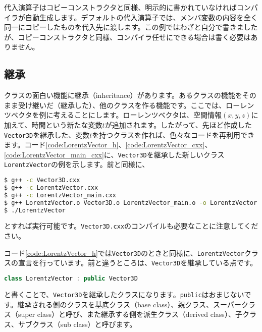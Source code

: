代入演算子はコピーコンストラクタと同様、明示的に書かれていなければコンパイラが自動生成します。デフォルトの代入演算子では、メンバ変数の内容を全く同一にコピーしたものを代入先に渡します。この例ではわざと自分で書きましたが、コピーコンストラクタと同様、コンパイラ任せにできる場合は書く必要はありません。

\subsection{継承}

クラスの面白い機能に継承（inheritance）があります。あるクラスの機能をそのまま受け継いだ（継承した）、他のクラスを作る機能です。ここでは、ローレンツベクタを例に考えることにします。ローレンツベクタは、空間情報$(x, y, z)$に加えて、時間という新たな変数$t$が追加されます。したがって、先ほど作成した\texttt{Vector3D}を継承した、変数$t$を持つクラスを作れば、色々なコードを再利用できます。コード\ref{code:LorentzVector_h}、\ref{code:LorentzVector_cxx}、\ref{code:LorentzVector_main_cxx}に、\texttt{Vector3D}を継承した新しいクラス\texttt{LorentzVector}の例を示します。前と同様に、
\begin{lstlisting}[language=bash]
$ g++ -c Vector3D.cxx
$ g++ -c LorentzVector.cxx
$ g++ -c LorentzVector_main.cxx
$ g++ LorentzVector.o Vector3D.o LorentzVector_main.o -o LorentzVector
$ ./LorentzVector
\end{lstlisting}
とすれば実行可能です。\texttt{Vector3D.cxx}のコンパイルも必要なことに注意してください。

\begin{NoFloat}

\end{NoFloat}
\begin{NoFloat}

\end{NoFloat}
\begin{NoFloat}

\end{NoFloat}

コード\ref{code:LorentzVector_h}では\texttt{Vector3D}のときと同様に、\texttt{LorentzVector}クラスの宣言を行っています。前と違うところは、\texttt{Vector3D}を継承している点です。
\begin{lstlisting}[language=c++]
class LorentzVector : public Vector3D
\end{lstlisting}
と書くことで、\texttt{Vector3D}を継承したクラスになります。\texttt{public}はおまじないです。継承される側のクラスを基底クラス（base class）、親クラス、スーパークラス（super class）と呼び、また継承する側を派生クラス（derived class）、子クラス、サブクラス（sub class）と呼びます。

